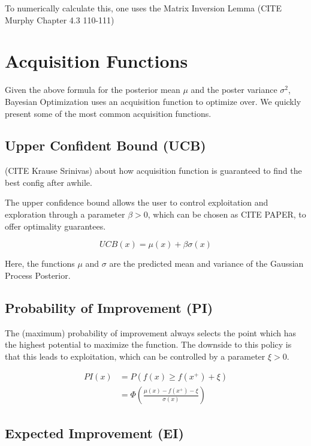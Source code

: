 To numerically calculate this, one uses the Matrix Inversion Lemma (CITE Murphy Chapter 4.3 110-111)


\section{Acquisition Functions}

Given the above formula for the posterior mean $\mu$ and the poster variance $\sigma^2$, Bayesian Optimization uses an acquisition function to optimize over.
We quickly present some of the most common acquisition functions.


\subsection{Upper Confident Bound (UCB)}
(CITE Krause Srinivas) about how acquisition function is guaranteed to find the best config after awhile.

The upper confidence bound allows the user to control exploitation and exploration through a parameter $\beta > 0$, which can be chosen as CITE PAPER, to offer optimality guarantees.

\begin{equation}
UCB(x) = \mu(x) + \beta \sigma(x)
\end{equation}

Here, the functions $\mu$ and $\sigma$ are the predicted mean and variance of the Gaussian Process Posterior.

\subsection{Probability of Improvement (PI)}
The (maximum) probability of improvement always selects the point which has the highest potential to maximize the function. 
The downside to this policy is that this leads to exploitation, which can be controlled by a parameter $\xi > 0$.

\begin{align}
    PI(x) & = P( f(x) \geq f(x^+) + \xi ) \\
    & = \Phi ( \frac{\mu(x) - f(x^+) - \xi}{\sigma(x)}  ) 
\end{align}


\subsection{Expected Improvement (EI)}

